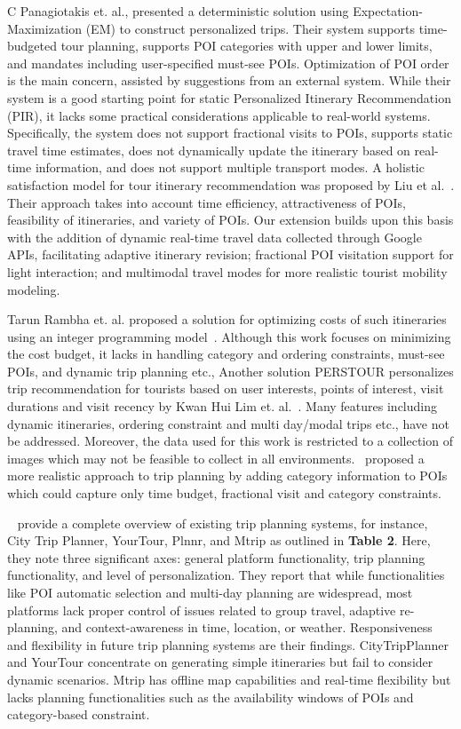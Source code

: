 \documentclass[sigconf,authordraft]{acmart}
\begin{document}
C Panagiotakis et. al.\cite{panagiotakis2024expectation}, presented a deterministic solution using Expectation-Maximization (EM) to construct personalized trips. Their system supports time-budgeted tour planning, supports POI categories with upper and lower limits, and mandates including user-specified must-see POIs. Optimization of POI order is the main concern, assisted by suggestions from an external system. While their system is a good starting point for static Personalized Itinerary Recommendation (PIR), it lacks some practical considerations applicable to real-world systems. Specifically, the system does not support fractional visits to POIs, supports static travel time estimates, does not dynamically update the itinerary based on real-time information, and does not support multiple transport modes. A holistic satisfaction model for tour itinerary recommendation was proposed by Liu et al.~\cite{liu2024personalized}. Their approach takes into account time efficiency, attractiveness of POIs, feasibility of itineraries, and variety of POIs. Our extension builds upon this basis with the addition of dynamic real-time travel data collected through Google APIs, facilitating adaptive itinerary revision; fractional POI visitation support for light interaction; and multimodal travel modes for more realistic tourist mobility modeling. 

Tarun Rambha et. al. proposed a solution for optimizing costs of such itineraries using an integer programming model~\cite{rambha2024optimized}. Although this work focuses on minimizing the cost budget, it lacks in handling category and ordering constraints, must-see POIs, and dynamic trip planning etc., Another solution PERSTOUR personalizes trip recommendation for tourists based on user interests, points of interest, visit durations and visit recency by Kwan Hui Lim et. al.~\cite{lim2018personalized}. Many features including dynamic itineraries, ordering constraint and multi day/modal trips etc., have not be addressed. Moreover, the data used for this work is restricted to a collection of images which may not be feasible to collect in all environments.~\cite{bolzoni2014efficient} proposed a more realistic approach to trip planning by adding category information to POIs which could capture only time budget, fractional visit and category constraints. 

~\cite{sylejmani2011survey} provide a complete overview of existing trip planning systems, for instance, City Trip Planner, YourTour, Plnnr, and Mtrip as outlined in \textbf{Table 2}. Here, they note three significant axes: general platform functionality, trip planning functionality, and level of personalization. They report that while functionalities like POI automatic selection and multi-day planning are widespread, most platforms lack proper control of issues related to group travel, adaptive re-planning, and context-awareness in time, location, or weather. Responsiveness and flexibility in future trip planning systems are their findings. CityTripPlanner and YourTour concentrate on generating simple itineraries but fail to consider dynamic scenarios. Mtrip has offline map capabilities and real-time flexibility but lacks planning functionalities such as the availability windows of POIs and category-based constraint.
\end{document}
